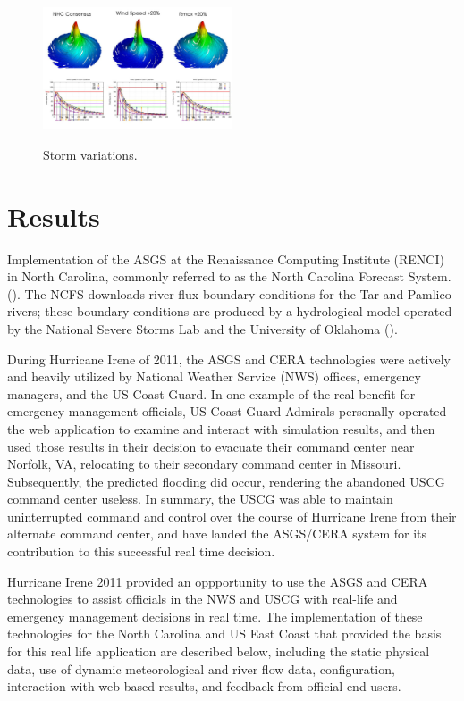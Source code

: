\documentclass[jmse,article,submit,moreauthors,pdftex,12pt,a4paper]{mdpi}
\begin{document}
\begin{figure}[t]
  \centering
  \noindent\includegraphics[width=0.5\textwidth]{variations}\\
  \caption{Storm variations.}
  \label{fig:storm_variations}
\end{figure}

\section{Results}

Implementation of the ASGS at the Renaissance Computing Institute 
(RENCI) in North Carolina, commonly referred to as the North 
Carolina Forecast System. (\cite{BlantonBO2012}). The NCFS downloads 
river flux boundary conditions for the Tar and Pamlico rivers; these 
boundary conditions are produced by a hydrological model operated by 
the National Severe Storms Lab and the University of Oklahoma (\cite
{VanCootenS2011}). 

During Hurricane Irene of 2011, the ASGS and CERA technologies were 
actively and heavily utilized by National Weather Service (NWS) 
offices, emergency managers, and the US Coast Guard. In one example 
of the real benefit for emergency management officials, US Coast 
Guard Admirals personally operated the web application to examine 
and interact with simulation results, and then used those results in 
their decision to evacuate their command center near Norfolk, VA, 
relocating to their secondary command center in Missouri. 
Subsequently, the predicted flooding did occur, rendering the 
abandoned USCG command center useless. In summary, the USCG was able 
to maintain uninterrupted command and control over the course of 
Hurricane Irene from their alternate command center, and have lauded 
the ASGS/CERA system for its contribution to this successful 
real time decision.

Hurricane Irene 2011 provided an oppportunity to use the ASGS and 
CERA technologies to assist officials in the NWS and USCG with 
real-life and emergency management decisions in real time. The 
implementation of these technologies for the North Carolina and US 
East Coast that provided the basis for this real life application 
are described below, including the static physical data, use of 
dynamic meteorological and river flow data, configuration, 
interaction with web-based results, and feedback from official end 
users. 
\end{document}
